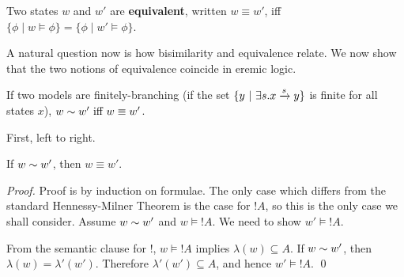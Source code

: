 \begin{definition}
Two states $w$ and $w'$ are {\bf equivalent}, written $w \equiv w'$,
iff $\{\phi \; | \; w \models \phi\} = \{\phi \; | \; w' \models
\phi\}$.
\end{definition}

\NI A natural question now is how bisimilarity and equivalence
relate. We now show that the two notions of equivalence coincide in
eremic logic.

\begin{theorem}
If two models are finitely-branching (if the set $\{y \ | \  \exists s
. x \xrightarrow{s} y\}$ is finite for all states $x$), $w \sim w'
\mbox{ iff } w \equiv w' $.
\end{theorem}
First, left to right.
\begin{case}
If $w \sim w'$, then $w \equiv w'$.
\end{case}
\begin{proof}
Proof is by induction on formulae.  The only case which differs from
the standard Hennessy-Milner Theorem is the case for $!A$, so this is
the only case we shall consider.  Assume $w \sim w'$ and $w \models
!A$. We need to show $w' \models !A$.

From the semantic clause for $!$,  $w \models !A$ implies $\lambda(w) \subseteq A$.
If $w \sim w'$, then $\lambda(w) = \lambda'(w')$.
Therefore $\lambda'(w') \subseteq A$, and hence $w' \models !A$.
\qed
\end{proof}

